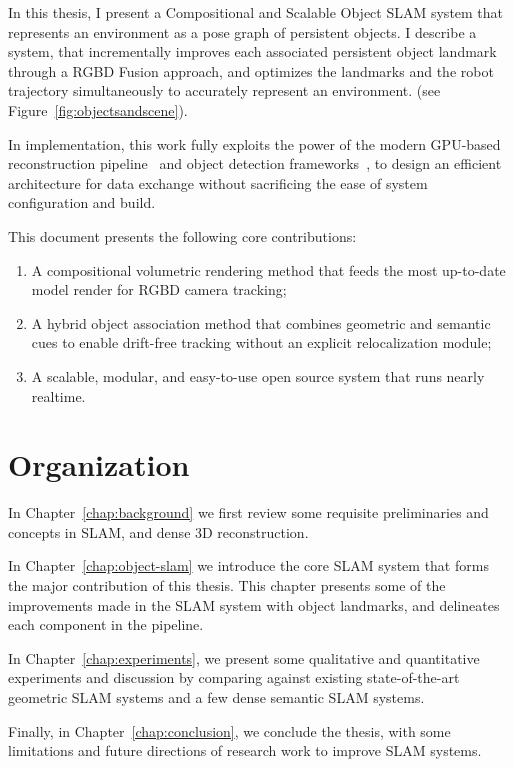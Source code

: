 In this thesis, I present a Compositional and Scalable Object SLAM system that represents an environment as a pose graph of persistent objects. I describe a system, that incrementally improves each associated persistent object landmark through a RGBD Fusion approach, and optimizes the landmarks and the robot trajectory simultaneously to accurately represent an environment. (see Figure~\ref{fig:objectsandscene}).

In implementation, this work fully exploits the power of the modern GPU-based reconstruction pipeline~\cite{dongGPUAcceleratedRobust2019} and object detection frameworks~\cite{kirillovPointRendImageSegmentation2020}, to design an efficient architecture for data exchange without sacrificing the ease of system configuration and build.


This document presents the following core contributions:

\begin{enumerate}
    \item A compositional volumetric rendering method that feeds the most up-to-date model render for RGBD camera tracking;
    \item A hybrid object association method that combines geometric and semantic cues to enable drift-free tracking without an explicit relocalization module;
    \item A scalable, modular, and easy-to-use open source system that runs nearly realtime.
\end{enumerate}

\section{Organization}

In Chapter~\ref{chap:background} we first review some requisite preliminaries and concepts in SLAM, and dense 3D reconstruction.

\noindent In Chapter~\ref{chap:object-slam} we introduce the core SLAM system that forms the major contribution of this thesis. This chapter presents some of the improvements made in the SLAM system with object landmarks, and delineates each component in the pipeline.

\noindent In Chapter~\ref{chap:experiments}, we present some qualitative and quantitative experiments and discussion by comparing against existing state-of-the-art geometric SLAM systems and a few dense semantic SLAM systems.

\noindent Finally, in Chapter~\ref{chap:conclusion}, we conclude the thesis, with some limitations and future directions of research work to improve SLAM systems.
